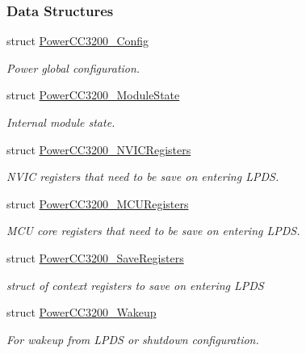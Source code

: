 \subsubsection*{Data Structures}
\begin{DoxyCompactItemize}
\item 
struct \hyperlink{struct_power_c_c3200___config}{Power\+C\+C3200\+\_\+\+Config}
\begin{DoxyCompactList}\small\item\em Power global configuration. \end{DoxyCompactList}\item 
struct \hyperlink{struct_power_c_c3200___module_state}{Power\+C\+C3200\+\_\+\+Module\+State}
\begin{DoxyCompactList}\small\item\em Internal module state. \end{DoxyCompactList}\item 
struct \hyperlink{struct_power_c_c3200___n_v_i_c_registers}{Power\+C\+C3200\+\_\+\+N\+V\+I\+C\+Registers}
\begin{DoxyCompactList}\small\item\em N\+V\+I\+C registers that need to be save on entering L\+P\+D\+S. \end{DoxyCompactList}\item 
struct \hyperlink{struct_power_c_c3200___m_c_u_registers}{Power\+C\+C3200\+\_\+\+M\+C\+U\+Registers}
\begin{DoxyCompactList}\small\item\em M\+C\+U core registers that need to be save on entering L\+P\+D\+S. \end{DoxyCompactList}\item 
struct \hyperlink{struct_power_c_c3200___save_registers}{Power\+C\+C3200\+\_\+\+Save\+Registers}
\begin{DoxyCompactList}\small\item\em struct of context registers to save on entering L\+P\+D\+S \end{DoxyCompactList}\item 
struct \hyperlink{struct_power_c_c3200___wakeup}{Power\+C\+C3200\+\_\+\+Wakeup}
\begin{DoxyCompactList}\small\item\em For wakeup from L\+P\+D\+S or shutdown configuration. \end{DoxyCompactList}\end{DoxyCompactItemize}
